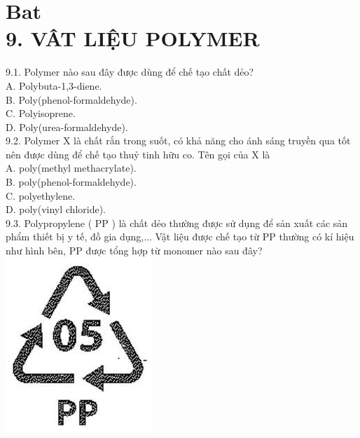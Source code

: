 \documentclass[10pt]{article}
\begin{document}
\section*{Bat \\
 9. VÂT LIỆU POLYMER}
9.1. Polymer nào sau đây được dùng để chế tạo chất dẻo?\\
A. Polybuta-1,3-diene.\\
B. Poly(phenol-formaldehyde).\\
C. Polyisoprene.\\
D. Poly(urea-formaldehyde).\\
9.2. Polymer X là chất rắn trong suốt, có khả năng cho ánh sáng truyền qua tốt nên được dùng để chế tạo thuỷ tinh hữu co. Tên gọi của X là\\
A. poly(methyl methacrylate).\\
B. poly(phenol-formaldehyde).\\
C. polyethylene.\\
D. poly(vinyl chloride).\\
9.3. Polypropylene ( PP ) là chất dẻo thường được sử dụng để sản xuất các sản phẩm thiết bị y tế, đồ gia dụng,... Vật liệu được chế tạo từ PP thường có kí hiệu như hình bên, PP được tổng hợp từ monomer nào sau đây?\\
\includegraphics[max width=\textwidth, center]{2025_10_23_80c1361fcdcd395cad8eg-28}\\
\end{document}
